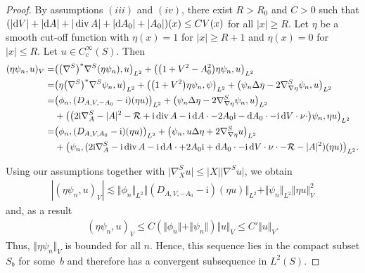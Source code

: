 \documentclass[10pt,a4paper]{amsart}
\numberwithin{equation}{section}
\begin{document}
\begin{proof}
By assumptions $(iii)$ and $(iv)$, there exist $R>R_0$ and $C>0$ such that $(|{\rm d}V| + |{\rm d}A| + |\operatorname{div} A|+|{\rm d}A_0| +|A_0|)(x)\leq C {V}(x)$ for all $|x|\geq R$. Let $\eta$ be a smooth cut-off function with $\eta(x)=1$ for $|x|\geq R+1$ and $\eta(x)=0$ for $|x|\leq R$. Let $u\in C_c^\infty(S)$. Then	
\begin{align*}
(\eta \psi_n, u)_{V} =&\bigl(\bigl(\nabla^S\bigr)^* \nabla^S (\eta \psi_n), u\bigr)_{L^2}+ \bigl(\bigl(1+V^2-A_0^2\bigr)\eta\psi_n, u\bigr)_{L^2}\\	
=&\bigl(\eta \bigl(\nabla^S\bigr)^* \nabla^S \psi_n, u\bigr)_{L^2}+ \bigl(\bigl(1+V^2\bigr)\eta\psi_n, \psi\bigr)_{L^2}+ \bigl(\psi_n  \Delta \eta -2 \nabla^S_{\nabla\eta} \psi_n, u\bigr)_{L^2}\\
=&\bigl(\phi_n, (D_{A,V,-A_0} -\mathrm{i})(\eta u)\bigr)_{L^2}+ \bigl(\psi_n \Delta \eta - 2 \nabla^S_{\nabla \eta} \psi_n,u\bigr)_{L^2}\\
&+\bigl(\bigl(2{\mathrm{i}}  \nabla^S_A -  |A|^2 -  \mathcal{R} + \mathrm{i}  \operatorname{div} A -  {\mathrm{i}} \, {\rm d}A\cdot -2A_0\mathrm{i}  -{\rm d}A_0\cdot - {\mathrm{i}} \, {\rm d}V \cdot  \nu\cdot \bigr) \psi_n, \eta u\bigr)_{L^2}\\
=&\bigl(\phi_n, (D_{A,V,A_0} -\mathrm{i})(\eta u)\bigr)_{L^2}+ \bigl( \psi_n ,u  \Delta \eta + 2 \nabla^S_{\nabla \eta} u\bigr)_{L^2}\\
&+\bigl(\psi_n, (2{\mathrm{i}}  \nabla^S_A - \mathrm{i}  \operatorname{div} A-  {\mathrm{i}}\,  {\rm d}A \cdot +2A_0\mathrm{i}  + {\rm d}A_0\cdot - {\mathrm{i}}  \, {\rm d}V \cdot  \nu \cdot  - \mathcal{R} -  |A|^2) (\eta u)\bigr)_{L^2}.
\end{align*}
	
Using our assumptions together with $\bigl| \nabla^S_X u\bigr|\leq |X|\bigl| \nabla^S u\bigr|$, we obtain
\begin{align*}
|(\eta \psi_n, u)_{V}| \lesssim \Vert \phi_n\Vert_{L^2}\Vert (D_{A,V,-A_0} -\mathrm{i})(\eta u)\Vert_{L^2} + \Vert \psi_n\Vert_{L^2} \Vert \eta u \Vert_{V}^2
\end{align*}
and, as a result
\begin{align*}
(\eta \psi_n, u)_{V} \leq C(\Vert \phi_n\Vert +\Vert \psi_n\Vert )\Vert u\Vert_{V}\leq C' \Vert u\Vert_{V}.
\end{align*}
Thus, $\Vert \eta \psi_n\Vert_{V}$ is bounded for all $n$. Hence, this sequence lies in the compact subset $S_b$ for some~$b$ and therefore has a convergent subsequence in $L^2(S)$.
\end{proof}
\end{document}
